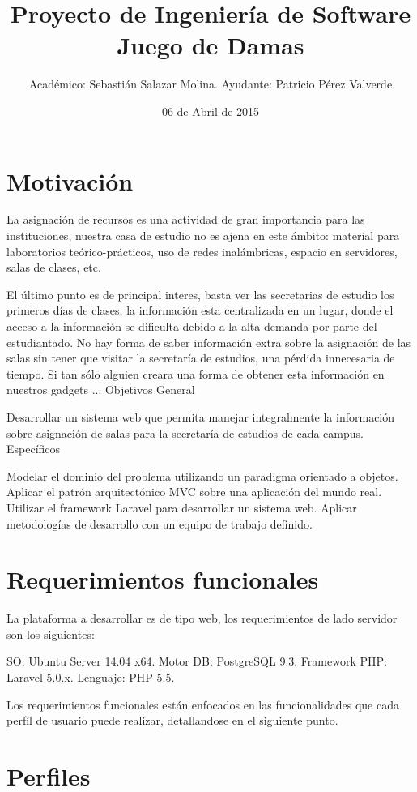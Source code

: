 \documentclass[a4paper,10pt]{article}
\title{Proyecto de Ingeniería de Software \newline Juego de Damas}
\author{Académico: Sebastián Salazar Molina. \newline Ayudante: Patricio Pérez Valverde }
\date{06 de Abril de 2015}
\begin{document}
\maketitle

\section{Motivación}

La asignación de recursos es una actividad de gran importancia para las instituciones, nuestra casa de estudio no es ajena en este ámbito: material para laboratorios teórico-prácticos, uso de redes inalámbricas, espacio en servidores, salas de clases, etc.

El último punto es de principal interes, basta ver las secretarias de estudio los primeros días de clases, la información esta centralizada en un lugar, donde el acceso a la información se dificulta debido a la alta demanda por parte del estudiantado. No hay forma de saber información extra sobre la asignación de las salas sin tener que visitar la secretaría de estudios, una pérdida innecesaria de tiempo. Si tan sólo alguien creara una forma de obtener esta información en nuestros gadgets ...
Objetivos
General

Desarrollar un sistema web que permita manejar integralmente la información sobre asignación de salas para la secretaría de estudios de cada campus.
Específicos

    Modelar el dominio del problema utilizando un paradigma orientado a objetos.
    Aplicar el patrón arquitectónico MVC sobre una aplicación del mundo real.
    Utilizar el framework Laravel para desarrollar un sistema web.
    Aplicar metodologías de desarrollo con un equipo de trabajo definido.

\section{Requerimientos funcionales}

La plataforma a desarrollar es de tipo web, los requerimientos de lado servidor son los siguientes:

    SO: Ubuntu Server 14.04 x64.
    Motor DB: PostgreSQL 9.3.
    Framework PHP: Laravel 5.0.x.
    Lenguaje: PHP 5.5.

Los requerimientos funcionales están enfocados en las funcionalidades que cada perfíl de usuario puede realizar, detallandose en el siguiente punto.

\section{Perfiles}
\end{document}
